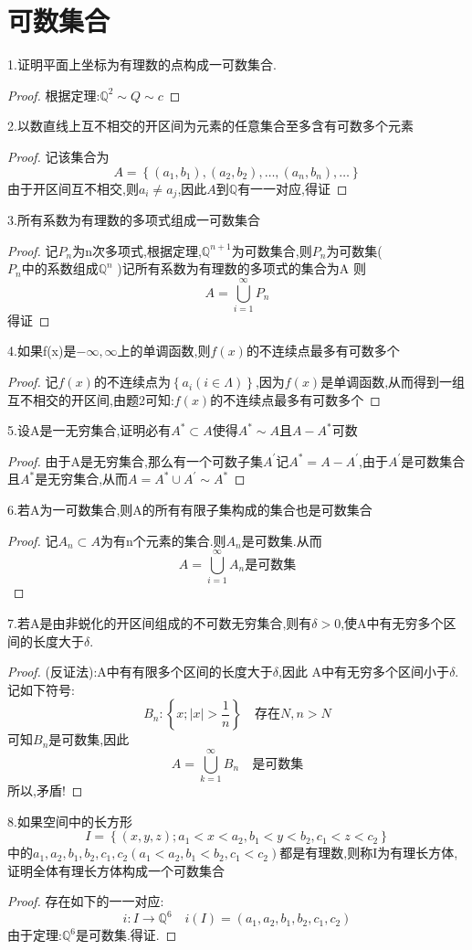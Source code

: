 \section{可数集合}
1.证明平面上坐标为有理数的点构成一可数集合.
\begin{proof}
    根据定理:\(\mathbb{Q}^2 \sim Q \sim c\)
\end{proof}
2.以数直线上互不相交的开区间为元素的任意集合至多含有可数多个元素
\begin{proof}
    记该集合为\[A=\left\{(a_1,b_1),(a_2,b_2),\dots,(a_n,b_n),\dots \right\}\]
    由于开区间互不相交,则\(a_i \neq a_j\),因此\(A\)到\(\mathbb{Q}\)有一一对应,得证
\end{proof}
3.所有系数为有理数的多项式组成一可数集合
\begin{proof}
    记\(P_n\)为n次多项式,根据定理,\(\mathbb{Q}^{n+1}\)为可数集合,则\(P_n\)为可数集(\(P_n \text{中的系数组成}\mathbb{Q}^n\) )记所有系数为有理数的多项式的集合为A
    则\[A=\bigcup\limits_{i=1}^{\infty}P_n \]得证
\end{proof}
4.如果f(x)是\(-\infty , \infty \)上的单调函数,则\(f(x)\)的不连续点最多有可数多个
\begin{proof}
    记\(f(x)\)的不连续点为\(\left\{a_i (i \in \Lambda)\right\}\),因为\(f(x)\)是单调函数,从而得到一组互不相交的开区间,由题2可知:\(f(x)\)的不连续点最多有可数多个
\end{proof}
5.设A是一无穷集合,证明必有\(A^{*} \subset A\)使得\(A^{*} \sim A\)且\(A -A^{*}\)可数
\begin{proof}
    由于A是无穷集合,那么有一个可数子集\(A^{'}\)记\(A^{*}=A - A^{'}\),由于\(A^{'}\)是可数集合且\(A^{*}\)是无穷集合,从而\(A=A^{*}\cup A^{'} \sim A^{*}\)
\end{proof}
6.若A为一可数集合,则A的所有有限子集构成的集合也是可数集合
\begin{proof}
    记\(A_n \subset A\)为有n个元素的集合.则\(A_n\)是可数集.从而\[A=\bigcup\limits_{i=1}^{\infty}A_n \text{是可数集}\]
\end{proof}
7.若A是由非蜕化的开区间组成的不可数无穷集合,则有\(\delta >0\),使A中有无穷多个区间的长度大于\(\delta\).
\begin{proof}
    (反证法):A中有有限多个区间的长度大于\(\delta\),因此 A中有无穷多个区间小于\(\delta\). 记如下符号:
    \[B_n :  \left\{x ; |x| > \frac{1}{n} \right\} \quad \text{存在} N , n>N \]
    可知\(B_n\)是可数集,因此\[A = \bigcup\limits_{k=1}^{\infty} B_n\quad \text{是可数集}\]
    所以,矛盾!
\end{proof}
8.如果空间中的长方形\[I = \left\{(x,y,z) ; a_1 < x<a_2 , b_1<y < b_2,c_1<z<c_2\right\}\]
中的\(a_1,a_2,b_1,b_2,c_1,c_2(a_1< a_2 , b_1 <b_2 ,c_1 <c_2)\)都是有理数,则称I为有理长方体,证明全体有理长方体构成一个可数集合
\begin{proof}
    存在如下的一一对应:\[i: I \rightarrow \mathbb{Q}^6 \quad i(I)=(a_1,a_2,b_1,b_2,c_1,c_2)\]
    由于定理:\(\mathbb{Q}^6\)是可数集.得证.
\end{proof}
